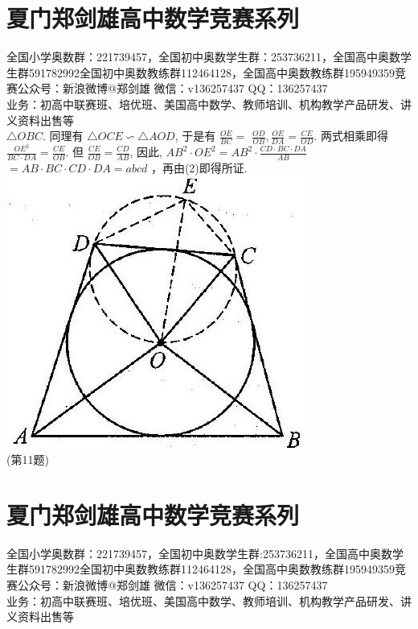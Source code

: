 \documentclass[10pt]{article}
\begin{document}
\section*{夏门郑剑雄高中数学竞赛系列}
全国小学奥数群：221739457，全国初中奥数学生群：253736211，全国高中奥数学生群591782992全国初中奥数教练群112464128，全国高中奥数教练群195949359竞赛公众号：新浪微博@郑剑雄 微信：v136257437 QQ：136257437\\
业务：初高中联赛班、培优班、美国高中数学、教师培训、机构教学产品研发、讲义资料出售等\\
$\triangle O B C$. 同理有 $\triangle O C E \backsim \triangle A O D$, 于是有 $\frac{O E}{B C}=$ $\frac{O D}{O B}, \frac{O E}{D A}=\frac{C E}{O D}$. 两式相乘即得 $\frac{O E^{2}}{B C \cdot D A}=\frac{C E}{O B}$. 但 $\frac{C E}{O B}=\frac{C D}{A B}$, 因此, $A B^{2} \cdot O E^{2}=A B^{2} \cdot \frac{C D \cdot B C \cdot D A}{A B}$ $=A B \cdot B C \cdot C D \cdot D A=a b c d$ ，再由(2)即得所证.\\
\includegraphics[max width=\textwidth, center]{2024_10_30_2c8f45efd4a519b08e1ag-184}\\
(第11题)

\section*{夏门郑剑雄高中数学竞赛系列}
全国小学奥数群：221739457，全国初中奥数学生群:253736211，全国高中奥数学生群591782992全国初中奥数教练群112464128，全国高中奥数教练群195949359竞赛公众号：新浪微博@郑剑雄 微信：v136257437 QQ：136257437\\
业务：初高中联赛班、培优班、美国高中数学、教师培训、机构教学产品研发、讲义资料出售等
\end{document}
